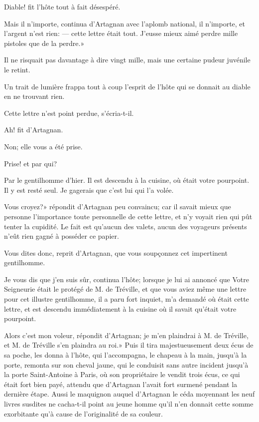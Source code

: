 \speak  Diable! fit l'hôte tout à fait désespéré. 

\speak  Mais il n'importe, continua d'Artagnan avec l'aplomb national, il n'importe, et l'argent n'est rien: --- cette lettre était tout. J'eusse mieux aimé perdre mille pistoles que de la perdre.» 

Il ne risquait pas davantage à dire vingt mille, mais une certaine pudeur juvénile le retint. 

Un trait de lumière frappa tout à coup l'esprit de l'hôte qui se donnait au diable en ne trouvant rien. 

\speak  Cette lettre n'est point perdue, s'écria-t-il. 

\speak  Ah! fit d'Artagnan. 

\speak  Non; elle vous a été prise. 

\speak  Prise! et par qui? 

\speak  Par le gentilhomme d'hier. Il est descendu à la cuisine, où était votre pourpoint. Il y est resté seul. Je gagerais que c'est lui qui l'a volée. 

\speak  Vous croyez?» répondit d'Artagnan peu convaincu; car il savait mieux que personne l'importance toute personnelle de cette lettre, et n'y voyait rien qui pût tenter la cupidité. Le fait est qu'aucun des valets, aucun des voyageurs présents n'eût rien gagné à posséder ce papier. 

\speak  Vous dites donc, reprit d'Artagnan, que vous soupçonnez cet impertinent gentilhomme. 

\speak  Je vous dis que j'en suis sûr, continua l'hôte; lorsque je lui ai annoncé que Votre Seigneurie était le protégé de M. de Tréville, et que vous aviez même une lettre pour cet illustre gentilhomme, il a paru fort inquiet, m'a demandé où était cette lettre, et est descendu immédiatement à la cuisine où il savait qu'était votre pourpoint. 

\speak  Alors c'est mon voleur, répondit d'Artagnan; je m'en plaindrai à M. de Tréville, et M. de Tréville s'en plaindra au roi.» Puis il tira majestueusement deux écus de sa poche, les donna à l'hôte, qui l'accompagna, le chapeau à la main, jusqu'à la porte, remonta sur son cheval jaune, qui le conduisit sans autre incident jusqu'à la porte Saint-Antoine à Paris, où son propriétaire le vendit trois écus, ce qui était fort bien payé, attendu que d'Artagnan l'avait fort surmené pendant la dernière étape. Aussi le maquignon auquel d'Artagnan le céda moyennant les neuf livres susdites ne cacha-t-il point au jeune homme qu'il n'en donnait cette somme exorbitante qu'à cause de l'originalité de sa couleur. 

